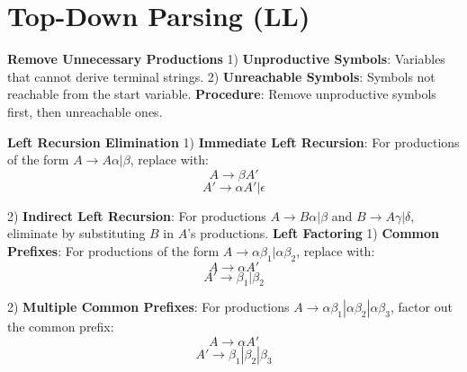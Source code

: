 







\section{Top-Down Parsing (LL)}
\textbf{Remove Unnecessary Productions}
1) \textbf{Unproductive Symbols}: Variables that cannot derive terminal strings.
2) \textbf{Unreachable Symbols}: Symbols not reachable from the start variable.
\textbf{Procedure}: Remove unproductive symbols first, then unreachable ones.

\textbf{Left Recursion Elimination}
1) \textbf{Immediate Left Recursion}: For productions of the form $A \to A\alpha | \beta$, replace with:
    \[
    A \to \beta A'
    \]
    \[
    A' \to \alpha A' | \epsilon
    \]
    
2) \textbf{Indirect Left Recursion}: For productions $A \to B\alpha | \beta$ and $B \to A\gamma | \delta$, eliminate by substituting $B$ in $A$'s productions.
\textbf{Left Factoring}
1) \textbf{Common Prefixes}: For productions of the form $A \to \alpha\beta_1 | \alpha\beta_2$, replace with:
    \[
    A \to \alpha A'
    \]
    \[
    A' \to \beta_1 | \beta_2
    \]
    
2) \textbf{Multiple Common Prefixes}: For productions $A \to \alpha\beta_1 | \alpha\beta_2 | \alpha\beta_3$, factor out the common prefix:
    \[
    A \to \alpha A'
    \]
    \[
    A' \to \beta_1 | \beta_2 | \beta_3
    \]
    

